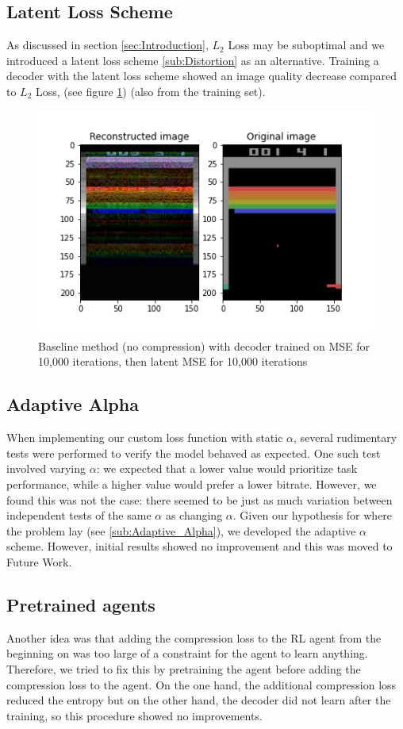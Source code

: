 \subsection{Latent Loss Scheme}
As discussed in section \ref{sec:Introduction}, $L_2$ Loss may be suboptimal and
we introduced a latent loss scheme \ref{sub:Distortion} as an alternative.
Training a decoder with the latent loss scheme showed an image quality decrease
compared to $L_2$ Loss, (see figure \ref{fig:baseline_MSE_latent}) (also from
the training set).

\begin{figure}[H]
    \centering
    \includegraphics[width=\linewidth]{images/orig_reconstructed_rl3.0.png}
    \caption{Baseline method (no compression) with decoder trained on MSE for 10,000 iterations, then latent MSE for 10,000 iterations}
    \label{fig:baseline_MSE_latent}
\end{figure}

\subsection{Adaptive Alpha}
When implementing our custom loss function with static $\alpha$, several
rudimentary tests were performed to verify the model behaved as expected. One
such test involved varying $\alpha$: we expected that a lower value would
prioritize task performance, while a higher value would prefer a lower bitrate.
However, we found this was not the case: there seemed to be just as much
variation between independent tests of the same $\alpha$ as changing $\alpha$.
Given our hypothesis for where the problem lay (see \ref{sub:Adaptive_Alpha}),
we developed the adaptive $\alpha$ scheme. However, initial results showed no
improvement and this was moved to Future Work.

\subsection{Pretrained agents}
Another idea was that adding the compression loss to the RL agent from the
beginning on was too large of a constraint for the agent to learn anything.
Therefore, we tried to fix this by pretraining the agent before adding
the compression loss to the agent. On the one hand, the additional compression
loss reduced the entropy but on the other hand, the decoder did not learn
after the training, so this procedure showed no improvements.


